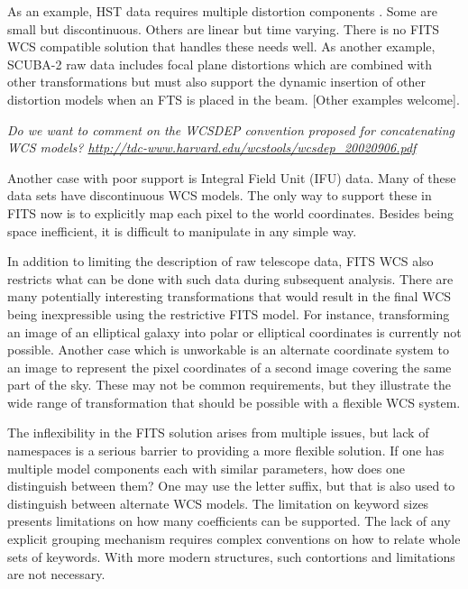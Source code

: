 \documentclass[final,authoryear,5p,times,twocolumn]{elsarticle}
\begin{document}
As an example, HST data requires multiple distortion components
\citep[see e.g.][]{2013ASPC..475...49H}. Some are small but
discontinuous. Others are linear but time varying. There is no FITS WCS
compatible solution that handles these needs well. As another example,
SCUBA-2 raw data \citep[see e.g.][]{2013MNRAS.430.2513H} includes focal
plane distortions which are combined with other transformations but
must also support the dynamic insertion of other distortion models
when an FTS \citep{2010SPIE.7741E..67G} is placed in the
beam. {\color{red} [Other examples welcome]}.

\textit{\color{red} Do we want to comment on the WCSDEP convention proposed for
  concatenating WCS models? \url{http://tdc-www.harvard.edu/wcstools/wcsdep_20020906.pdf}}

Another case with poor support is Integral Field Unit (IFU) data.
Many of these data sets
have discontinuous WCS models. The only way to support these in FITS
now is to explicitly map each pixel to the world coordinates. Besides
being space inefficient, it is difficult to manipulate in any simple
way.


In addition to limiting the description of raw telescope data, FITS
WCS also restricts what can be done with such data during subsequent
analysis. There are many potentially interesting transformations that
would result in the final WCS being inexpressible using the
restrictive FITS model. For instance, transforming an image of an
elliptical galaxy into polar or elliptical coordinates is currently not possible. Another
case which is unworkable is an alternate coordinate system to an image to
represent the pixel coordinates of a second image covering the same
part of the sky.  These may not be common requirements, but they
illustrate the wide range of transformation that should be possible
with a flexible WCS system.


The inflexibility in the FITS solution arises from multiple issues,
but lack of namespaces is a serious barrier to providing a more
flexible solution. If one has multiple model components each with
similar parameters, how does one distinguish between them? One may use
the letter suffix, but that is also used to distinguish between
alternate WCS models. The limitation on keyword sizes presents
limitations on how many coefficients can be supported. The lack of any
explicit grouping mechanism requires complex conventions on how to
relate whole sets of keywords. With more modern structures, such
contortions and limitations are not necessary.
\end{document}
